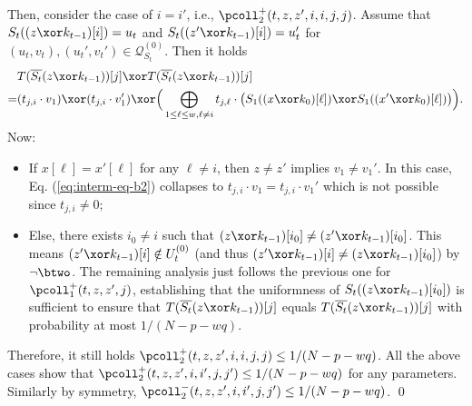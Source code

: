 	
	Then, consider the case of $i=i'$, i.e., $\pcoll_{2}^+(t,z,z',i,i,j,j)$. Assume that $S_t((z\xor k_{t-1})[i])=u_t$ and $S_t((z'\xor k_{t-1})[i])=u_t'$ for $(u_t,v_t),(u_t',v_t')\in\mathcal{Q}_{S_t}^{(0)}$. Then it holds      {\small
		\begin{align}
		&   T(\overline{S_t}(z\xor k_{t-1}))[j]\xor T(\overline{S_t}(z\xor k_{t-1}))[j]        \notag   \\
		= &
		(t_{j,i}\cdot v_1)
		\xor
		(t_{j,i}\cdot v_1')
		\xor
		\Big(\bigoplus_{1\leq\ell\leq w,\ell\neq i}t_{j,\ell}\cdot
		\big(S_1((x\xor k_0)[\ell])\xor S_1((x'\xor k_0)[\ell])\big)\Big)    .
		\label{eq:interm-eq-b2}
		\end{align}
	}%
	Now:
	\begin{itemize}
		\item If $x[\ell]=x'[\ell]$ for any $\ell\neq i$, then $z\neq z'$ implies $v_1\neq v_1'$. In this case, Eq. (\ref{eq:interm-eq-b2}) collapses to $t_{j,i}\cdot v_1=t_{j,i}\cdot v_1'$ which is not possible since $t_{j,i}\neq 0$;
		\item Else, there exists $i_0\neq i$ such that $(z\xor k_{t-1})[i_0]\neq(z'\xor k_{t-1})[i_0]$. This means $(z'\xor k_{t-1})[i]\notin U_t^{(0)}$ (and thus $(z'\xor k_{t-1})[i]\neq(z\xor k_{t-1})[i_0]$) by $\neg\btwo$. The remaining analysis just follows the previous one for $\pcoll_{1}^+(t,z,z',j)$, establishing that the uniformness of $S_t((z\xor k_{t-1})[i_0])$ is sufficient to ensure that $T(\overline{S_t}(z\xor k_{t-1}))[j]$ equals $T(\overline{S_t}(z\xor k_{t-1}))[j]$ with probability at most $1/(N-p-wq)$.
	\end{itemize}
	Therefore, it still holds $\pcoll_{2}^+(t,z,z',i,i,j,j)\leq1/(N-p-wq)$. All the above cases show that $\pcoll_{2}^+(t,z,z',i,i',j,j')\leq1/(N-p-wq)$ for any parameters. Similarly by symmetry, $\pcoll_{2}^-(t,z,z',i,i',j,j')\leq1/(N-p-wq)$.         \qed